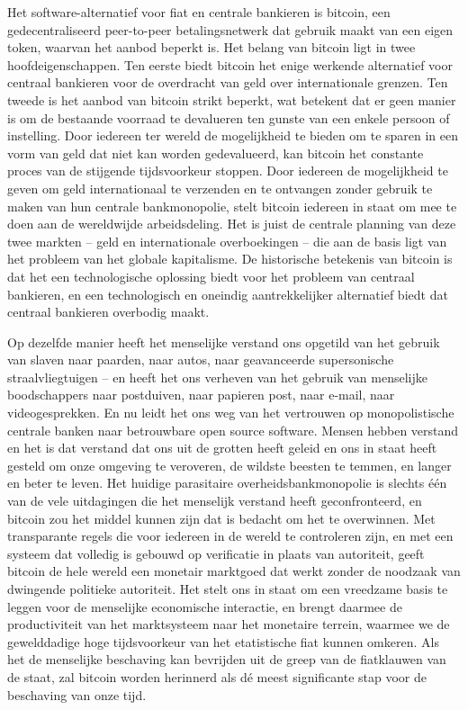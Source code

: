 Het software-alternatief voor fiat en centrale bankieren is bitcoin, een gedecentraliseerd peer-to-peer betalingsnetwerk dat gebruik maakt van een eigen token, waarvan het aanbod beperkt is. Het belang van bitcoin ligt in twee hoofdeigenschappen. Ten eerste biedt bitcoin het enige werkende alternatief voor centraal bankieren voor de overdracht van geld over internationale grenzen. Ten tweede is het aanbod van bitcoin strikt beperkt, wat betekent dat er geen manier is om de bestaande voorraad te devalueren ten gunste van een enkele persoon of instelling. Door iedereen ter wereld de mogelijkheid te bieden om te sparen in een vorm van geld dat niet kan worden gedevalueerd, kan bitcoin het constante proces van de stijgende tijdsvoorkeur stoppen. Door iedereen de mogelijkheid te geven om geld internationaal te verzenden en te ontvangen zonder gebruik te maken van hun centrale bankmonopolie, stelt bitcoin iedereen in staat om mee te doen aan de wereldwijde arbeidsdeling. Het is juist de centrale planning van deze twee markten -- geld en internationale overboekingen -- die aan de basis ligt van het probleem van het globale kapitalisme. De historische betekenis van bitcoin is dat het een technologische oplossing biedt voor het probleem van centraal bankieren, en een technologisch en oneindig aantrekkelijker alternatief biedt dat centraal bankieren overbodig maakt.

Op dezelfde manier heeft het menselijke verstand ons opgetild van het gebruik van slaven naar paarden, naar auto\textquotesingle s, naar geavanceerde supersonische straalvliegtuigen -- en heeft het ons verheven van het gebruik van menselijke boodschappers naar postduiven, naar papieren post, naar e-mail, naar videogesprekken. En nu leidt het ons weg van het vertrouwen op monopolistische centrale banken naar betrouwbare open source software. Mensen hebben verstand en het is dat verstand dat ons uit de grotten heeft geleid en ons in staat heeft gesteld om onze omgeving te veroveren, de wildste beesten te temmen, en langer en beter te leven. Het huidige parasitaire overheidsbankmonopolie is slechts één van de vele uitdagingen die het menselijk verstand heeft geconfronteerd, en bitcoin zou het middel kunnen zijn dat is bedacht om het te overwinnen. Met transparante regels die voor iedereen in de wereld te controleren zijn, en met een systeem dat volledig is gebouwd op verificatie in plaats van autoriteit, geeft bitcoin de hele wereld een monetair marktgoed dat werkt zonder de noodzaak van dwingende politieke autoriteit. Het stelt ons in staat om een vreedzame basis te leggen voor de menselijke economische interactie, en brengt daarmee de productiviteit van het marktsysteem naar het monetaire terrein, waarmee we de gewelddadige hoge tijdsvoorkeur van het etatistische fiat kunnen omkeren. Als het de menselijke beschaving kan bevrijden uit de greep van de fiatklauwen van de staat, zal bitcoin worden herinnerd als dé meest significante stap voor de beschaving van onze tijd.
